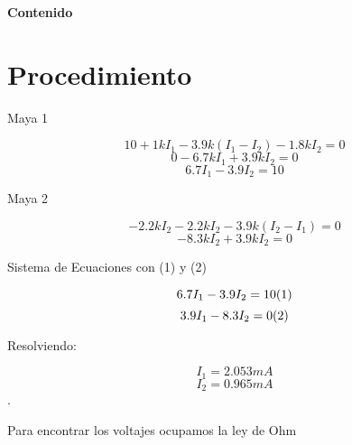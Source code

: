 \documentclass[a4paper, 11pt]{article}
\begin{document}
\textbf{}
\newpage

\begin{flushright}
\textbf{\Huge Contenido}
\end{flushright}

\renewcommand*\contentsname{}
{%
\tableofcontents
}



\newpage

\section{Procedimiento}

Maya 1

\begin{equation*}
10+1kI_1-3.9k(I_1-I_2)-1.8kI_2=0
\end{equation*}
\begin{equation*}
0-6.7kI_1+3.9kI_2=0
\end{equation*}
\begin{equation*}
6.7I_1-3.9I_2=10
\end{equation*}

Maya 2

\begin{equation*}
 -2.2kI_2-2.2kI_2-3.9k(I_2-I_1)=0 
\end{equation*}
\begin{equation*}
 -8.3kI_2+3.9kI_2=0
\end{equation*}

Sistema de Ecuaciones con (1) y (2)

\begin{equation*}
6.7I_1-3.9I_2=10 \\
(1)
\end{equation*}
\begin{equation*}
3.9I_1-8.3I_2=0 \\
(2)
\end{equation*}

Resolviendo:

\begin{equation*}
I_1=2.053 mA
\end{equation*} 
\begin{equation*}
I_2=0.965 mA
\end{equation*}.

Para encontrar los voltajes ocupamos la ley de Ohm
\end{document}

